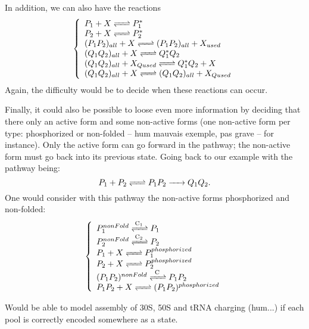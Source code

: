 In addition, we can also have the reactions
$$
  \left\{
    \begin{array}{l}
      \reactionRev{P_1 + X}{P_1^*}{}{} \\
      \reactionRev{P_2 + X}{P_2^*}{}{} \\
      \reactionRev{(P_1P_2)_{all} + X}{(P_1P_2)_{all} + X_{used}}{}{} \\
      \reactionRev{(Q_1Q_2)_{all} + X}{Q_1^*Q_2}{}{} \\
      \reactionRev{(Q_1Q_2)_{all} + X_{Qused}}{Q_1^*Q_2 + X}{}{} \\
      \reactionRev{(Q_1Q_2)_{all} + X}{(Q_1Q_2)_{all} + X_{Qused}}{}{} \\
    \end{array}
  \right.
$$
Again, the difficulty would be to decide when these reactions can occur.

Finally, it could also be possible to loose even more information by deciding that there only an active form and some non-active forms (one non-active form per type: phosphorized or non-folded -- hum mauvais exemple, pas grave -- for instance). Only the active form can go forward in the pathway; the non-active form must go back into its previous state. Going back to our example with the pathway being:
$$
  \reactionIrr{\reactionRev{P_1+P_2}{P_1P_2}{}{}}{Q_1Q_2}{}{} .
$$
One would consider with this pathway the non-active forms phosphorized and non-folded:
$$
  \left\{
    \begin{array}{l}
      \reactionRev{P_1^{nonFold}}{P_1}{C_1}{} \\
      \reactionRev{P_2^{nonFold}}{P_2}{C_2}{} \\
      \reactionRev{P_1 + X}{P_1^{phosphorized}}{}{} \\
      \reactionRev{P_2 + X}{P_2^{phosphorized}}{}{} \\
      \reactionRev{(P_1P_2)^{nonFold}}{P_1P_2}{C}{} \\
      \reactionRev{P_1P_2 + X}{(P_1P_2)^{phosphorized}}{}{} \\
    \end{array}
  \right.
$$



\medskip

\textcolor[rgb]{1.00,0.00,0.00}{Would be able to model assembly of 30S, 50S and tRNA charging (hum...) if each pool is correctly encoded somewhere as a state.
} 